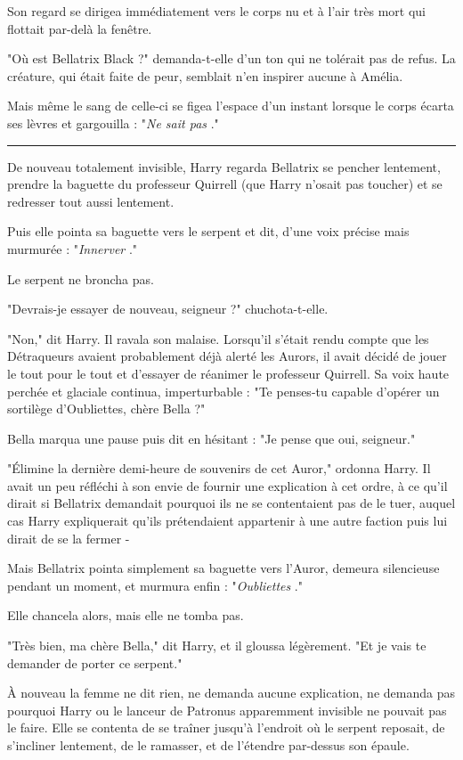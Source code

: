 Son regard se dirigea immédiatement vers le corps nu et à l'air très mort qui flottait par-delà la fenêtre.

"Où est Bellatrix Black ?" demanda-t-elle d'un ton qui ne tolérait pas de refus. La créature, qui était faite de peur, semblait n'en inspirer aucune à Amélia.

Mais même le sang de celle-ci se figea l'espace d'un instant lorsque le corps écarta ses lèvres et gargouilla : "\emph{Ne sait pas} ."
\par\noindent\rule{\textwidth}{0.4pt}
De nouveau totalement invisible, Harry regarda Bellatrix se pencher lentement, prendre la baguette du professeur Quirrell (que Harry n'osait pas toucher) et se redresser tout aussi lentement.

Puis elle pointa sa baguette vers le serpent et dit, d'une voix précise mais murmurée : "\emph{Innerver} ."

Le serpent ne broncha pas.

"Devrais-je essayer de nouveau, seigneur ?" chuchota-t-elle.

"Non," dit Harry. Il ravala son malaise. Lorsqu'il s'était rendu compte que les Détraqueurs avaient probablement déjà alerté les Aurors, il avait décidé de jouer le tout pour le tout et d'essayer de réanimer le professeur Quirrell. Sa voix haute perchée et glaciale continua, imperturbable : "Te penses-tu capable d'opérer un sortilège d'Oubliettes, chère Bella ?"

Bella marqua une pause puis dit en hésitant : "Je pense que oui, seigneur."

"Élimine la dernière demi-heure de souvenirs de cet Auror," ordonna Harry. Il avait un peu réfléchi à son envie de fournir une explication à cet ordre, à ce qu'il dirait si Bellatrix demandait pourquoi ils ne se contentaient pas de le tuer, auquel cas Harry expliquerait qu'ils prétendaient appartenir à une autre faction puis lui dirait de se la fermer -

Mais Bellatrix pointa simplement sa baguette vers l'Auror, demeura silencieuse pendant un moment, et murmura enfin : "\emph{Oubliettes} ."

Elle chancela alors, mais elle ne tomba pas.

"Très bien, ma chère Bella," dit Harry, et il gloussa légèrement. "Et je vais te demander de porter ce serpent."

À nouveau la femme ne dit rien, ne demanda aucune explication, ne demanda pas pourquoi Harry ou le lanceur de Patronus apparemment invisible ne pouvait pas le faire. Elle se contenta de se traîner jusqu'à l'endroit où le serpent reposait, de s'incliner lentement, de le ramasser, et de l'étendre par-dessus son épaule.

